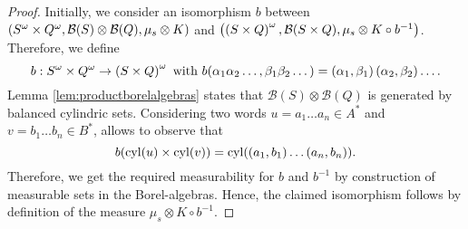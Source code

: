 \begin{proof}
  Initially, we consider an isomorphism $b$ between
  $\left(S^{\omega}\times Q^{\omega}, \mathcal{B}(S)\otimes\mathcal{B}(Q),
  \mu_{s}\otimes K\right)$ and $\left(\left(S\times Q\right)^{\omega},
  \mathcal{B}(S\times Q), \mu_{s}\otimes K\circ b^{-1}\right)$. Therefore, we define
  \begin{equation*}
    b:S^{\omega}\times Q^{\omega}\rightarrow\left(S\times Q\right)^{\omega}
    \text{ with }b(\alpha_{1}\alpha_{2}\dots, \beta_{1}\beta_{2}\dots) = 
      \left(\alpha_{1}, \beta_{1}\right)\left(\alpha_{2}, \beta_{2}\right)\dots.
  \end{equation*}
  Lemma \ref{lem:productborelalgebras} states that
  $\mathcal{B}(S)\otimes\mathcal{B}(Q)$ is generated by balanced cylindric
  sets. Considering two words $u = a_{1}\dots a_{n}\in A^{*}$ and
  $v = b_{1}\dots b_{n}\in B^{*}$, allows to observe that
  \begin{equation*}
    b(\operatorname{cyl}(u)\times\operatorname{cyl}(v)) = \operatorname{cyl}(\left(a_{1}, b_{1}\right)\dots
      \left(a_{n}, b_{n}\right)).
  \end{equation*}
  Therefore, we get the required measurability for $b$ and $b^{-1}$ by
  construction of measurable sets in the Borel-algebras. Hence, the claimed
  isomorphism follows by definition of the measure
  $\mu_{s}\otimes K\circ b^{-1}$.


\end{proof}
